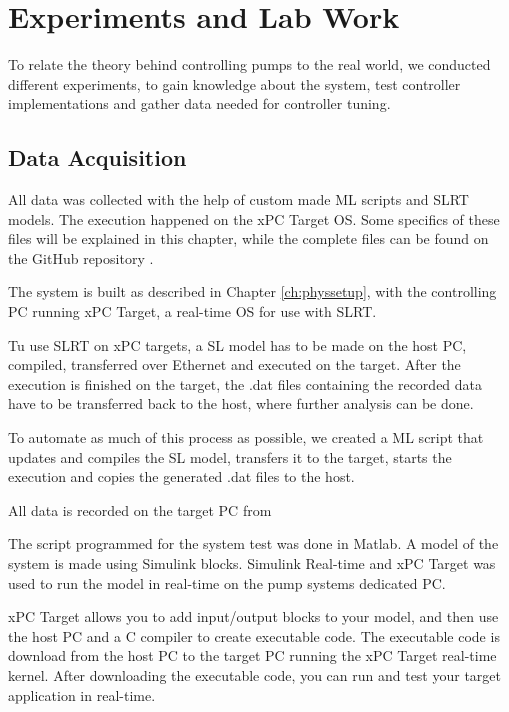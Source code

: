 \chapter{Experiments and Lab Work}\label{ch:experiment}
To relate the theory behind controlling pumps to the real world,
we conducted different experiments,
to gain knowledge about the system,
test controller implementations and gather data needed for controller tuning.


\section{Data Acquisition}\label{sec:data_gathering}
All data was collected with the help of custom made 
ML scripts and SLRT models.
The execution happened on the xPC Target OS.
Some specifics of these files will be explained in this chapter,
while the complete files can be found on the GitHub repository \cite{GitHub}.

The system is built as described in Chapter \ref{ch:physsetup},
with the controlling PC running xPC Target,
a real-time OS for use with SLRT.

Tu use SLRT on xPC targets, a SL model has to be made on the host PC,
compiled, transferred over Ethernet and executed on the target.
After the execution is finished on the target,
the .dat files containing the recorded data have to be transferred back to the host,
where further analysis can be done.

To automate as much of this process as possible,
we created a ML script that updates and compiles the SL model, transfers it to the target,
starts the execution and copies the generated .dat files to the host.

All data is recorded on the target PC from


The script programmed for the system test was done in Matlab. 
A model of the system is made using Simulink blocks. 
Simulink Real-time and xPC Target was used to run the model in real-time on 
the pump systems dedicated PC. 




xPC Target allows you to add input/output blocks to your model, and then use the host 
PC and a C compiler to create executable code. The executable code is download 
from the host PC to the target PC running the xPC Target real-time kernel. 
After downloading the executable code, you can run and test your target 
application in real-time. 

